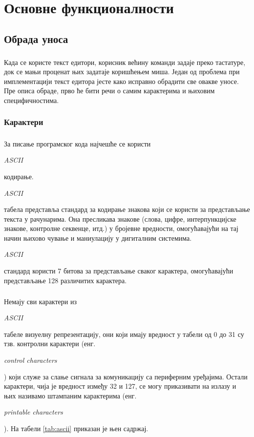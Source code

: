 \documentclass[12pt,oneside]{memoir}
\begin{document}
\chapter{Основне функционалности}
\label{chp:osnovne_funkcionalnosti}

\section{Обрада уноса}
\paragraph{}
Када се користе текст едитори, корисник већину команди задаје преко тастатуре, док се
мањи проценат њих задатаје коришћењем миша. Један од проблема при 
имплементацији текст едитора јесте како исправно обрадити све овакве уносе. 
Пре описа обраде, прво ће бити речи о самим карактерима и њиховим специфичностима. 

\subsection{Карактери}
\paragraph{}
За писање програмског кода најчешће се користи \begin{latinica}\textit{ASCII}\end{latinica} кодирање. \begin{latinica}\textit{ASCII}\end{latinica} табела представља стандард за кодирање
знакова који се користи за представљање текста у рачунарима. Она пресликава знакове
(слова, цифре, интерпункцијске знакове, контролне секвенце, итд.) у бројевне вредности,
омогућавајући на тај начин њихово чување и маниулацију у дигиталним системима. 
\begin{latinica}\textit{ASCII}\end{latinica} стандард користи 7 битова за представљање
сваког карактера, омогућавајући представљање 128 различитих карактера.


\paragraph{}
Немају сви карактери из \begin{latinica}\textit{ASCII}\end{latinica} табеле визуелну
репрезентацију, они који имају вредност у табели од 0 до 31 су тзв. контролни карактери 
(енг. \begin{latinica}\textit{control characters}\end{latinica}) који служе за
слање сигнала за комуникацију са периферним уређајима. Остали карактери, чија је вредност
између 32 и 127, се могу приказивати на излазу и њих називамо штампаним
карактерима (енг. \begin{latinica}\textit{printable characters}\end{latinica}).
На табели \ref{tab:ascii} приказан је њен садржај.
\end{document}

